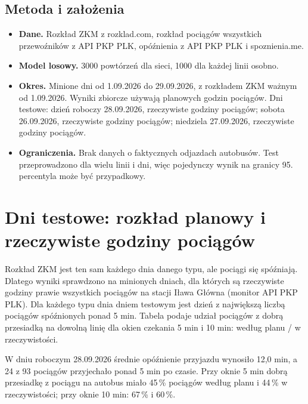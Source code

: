 \documentclass[10pt,a4paper]{article}
\begin{document}
\subsection*{Metoda i założenia}
\begin{itemize}
\item \textbf{Dane.} Rozkład ZKM z rozklad.com, rozkład pociągów wszystkich przewoźników z API PKP PLK, opóźnienia z API PKP PLK i spoznienia.me.
\item \textbf{Model losowy.} 3000 powtórzeń dla sieci, 1000 dla każdej linii osobno.
\item \textbf{Okres.} Minione dni od 1.09.2026 do 29.09.2026, z rozkładem ZKM ważnym od 1.09.2026. Wyniki zbiorcze używają planowych godzin pociągów. Dni testowe: dzień roboczy 28.09.2026, rzeczywiste godziny pociągów; sobota 26.09.2026, rzeczywiste godziny pociągów; niedziela 27.09.2026, rzeczywiste godziny pociągów.
\item \textbf{Ograniczenia.} Brak danych o faktycznych odjazdach autobusów. Test przeprowadzono dla wielu linii i dni, więc pojedynczy wynik na granicy 95. percentyla może być przypadkowy.
\end{itemize}
\section{Dni testowe: rozkład planowy i rzeczywiste godziny pociągów}
Rozkład ZKM jest ten sam każdego dnia danego typu, ale pociągi się spóźniają. Dlatego wyniki sprawdzono na minionych dniach, dla których są rzeczywiste godziny prawie wszystkich pociągów na stacji Iława Główna (monitor API PKP PLK). Dla każdego typu dnia dniem testowym jest dzień z największą liczbą pociągów spóźnionych ponad 5 min. Tabela podaje udział pociągów z dobrą przesiadką na dowolną linię dla okien czekania 5 min i 10 min: według planu / w rzeczywistości.

W dniu roboczym 28.09.2026 średnie opóźnienie przyjazdu wynosiło 12,0 min, a 24 z 93 pociągów przyjechało ponad 5 min po czasie. Przy oknie 5 min dobrą przesiadkę z pociągu na autobus miało 45\,\% pociągów według planu i 44\,\% w rzeczywistości; przy oknie 10 min: 67\,\% i 60\,\%.
\end{document}
